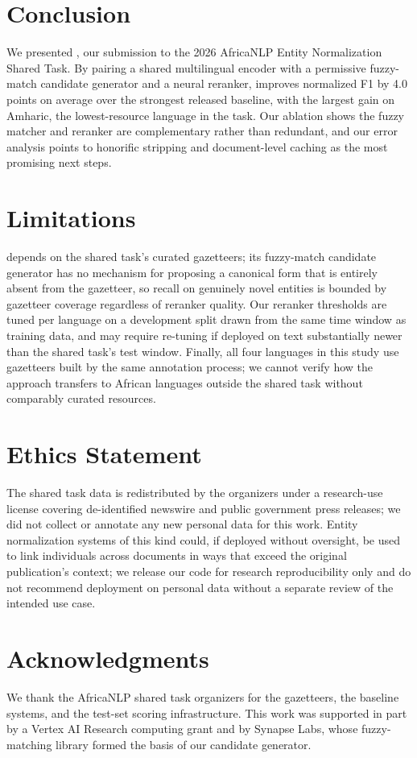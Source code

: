 \section{Conclusion}

We presented , our submission to the 2026 AfricaNLP Entity
Normalization Shared Task. By pairing a shared multilingual encoder with a
permissive fuzzy-match candidate generator and a neural reranker,
 improves normalized F1 by 4.0 points on average over the
strongest released baseline, with the largest gain on Amharic, the
lowest-resource language in the task. Our ablation shows the fuzzy
matcher and reranker are complementary rather than redundant, and our
error analysis points to honorific stripping and document-level caching
as the most promising next steps.

\section*{Limitations}
 depends on the shared task's curated gazetteers; its
fuzzy-match candidate generator has no mechanism for proposing a
canonical form that is entirely absent from the gazetteer, so recall on
genuinely novel entities is bounded by gazetteer coverage regardless of
reranker quality. Our reranker thresholds are tuned per language on a
development split drawn from the same time window as training data, and
may require re-tuning if deployed on text substantially newer than the
shared task's test window. Finally, all four languages in this study use
gazetteers built by the same annotation process; we cannot verify how the
approach transfers to African languages outside the shared task without
comparably curated resources.

\section*{Ethics Statement}
The shared task data is redistributed by the organizers under a
research-use license covering de-identified newswire and public
government press releases; we did not collect or annotate any new
personal data for this work. Entity normalization systems of this kind
could, if deployed without oversight, be used to link individuals across
documents in ways that exceed the original publication's context; we
release our code for research reproducibility only and do not recommend
deployment on personal data without a separate review of the intended use
case.

\section*{Acknowledgments}
We thank the AfricaNLP shared task organizers for the gazetteers, the
baseline systems, and the test-set scoring infrastructure. This work was
supported in part by a Vertex AI Research computing grant and by Synapse
Labs, whose fuzzy-matching library formed the basis of our candidate
generator.



